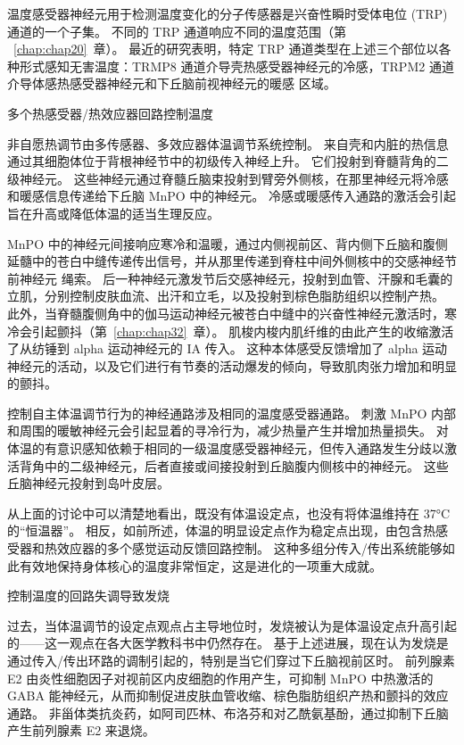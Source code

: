 温度感受器神经元用于检测温度变化的分子传感器是兴奋性瞬时受体电位 (TRP) 通道的一个子集。
不同的 TRP 通道响应不同的温度范围（第 ~\ref{chap:chap20}~章）。
最近的研究表明，特定 TRP 通道类型在上述三个部位以各种形式感知无害温度：TRMP8 通道介导壳热感受器神经元的冷感，TRPM2 通道介导体感热感受器神经元和下丘脑前视神经元的暖感 区域。


多个热感受器/热效应器回路控制温度

非自愿热调节由多传感器、多效应器体温调节系统控制。
来自壳和内脏的热信息通过其细胞体位于背根神经节中的初级传入神经上升。
它们投射到脊髓背角的二级神经元。
这些神经元通过脊髓丘脑束投射到臂旁外侧核，在那里神经元将冷感和暖感信息传递给下丘脑 MnPO 中的神经元。
冷感或暖感传入通路的激活会引起旨在升高或降低体温的适当生理反应。


MnPO 中的神经元间接响应寒冷和温暖，通过内侧视前区、背内侧下丘脑和腹侧延髓中的苍白中缝传递传出信号，并从那里传递到脊柱中间外侧核中的交感神经节前神经元 绳索。
后一种神经元激发节后交感神经元，投射到血管、汗腺和毛囊的立肌，分别控制皮肤血流、出汗和立毛，以及投射到棕色脂肪组织以控制产热。
此外，当脊髓腹侧角中的伽马运动神经元被苍白中缝中的兴奋性神经元激活时，寒冷会引起颤抖（第~\ref{chap:chap32}~章）。
肌梭内梭内肌纤维的由此产生的收缩激活了从纺锤到 alpha 运动神经元的 IA 传入。
这种本体感受反馈增加了 alpha 运动神经元的活动，以及它们进行有节奏的活动爆发的倾向，导致肌肉张力增加和明显的颤抖。


控制自主体温调节行为的神经通路涉及相同的温度感受器通路。
刺激 MnPO 内部和周围的暖敏神经元会引起显着的寻冷行为，减少热量产生并增加热量损失。
对体温的有意识感知依赖于相同的一级温度感受器神经元，但传入通路发生分歧以激活背角中的二级神经元，后者直接或间接投射到丘脑腹内侧核中的神经元。
这些丘脑神经元投射到岛叶皮层。


从上面的讨论中可以清楚地看出，既没有体温设定点，也没有将体温维持在 37°C 的“恒温器”。
相反，如前所述，体温的明显设定点作为稳定点出现，由包含热感受器和热效应器的多个感觉运动反馈回路控制。
这种多组分传入/传出系统能够如此有效地保持身体核心的温度非常恒定，这是进化的一项重大成就。


控制温度的回路失调导致发烧

过去，当体温调节的设定点观点占主导地位时，发烧被认为是体温设定点升高引起的——这一观点在各大医学教科书中仍然存在。
基于上述进展，现在认为发烧是通过传入/传出环路的调制引起的，特别是当它们穿过下丘脑视前区时。
前列腺素 E2 由炎性细胞因子对视前区内皮细胞的作用产生，可抑制 MnPO 中热激活的 GABA 能神经元，从而抑制促进皮肤血管收缩、棕色脂肪组织产热和颤抖的效应通路。
非甾体类抗炎药，如阿司匹林、布洛芬和对乙酰氨基酚，通过抑制下丘脑产生前列腺素 E2 来退烧。




